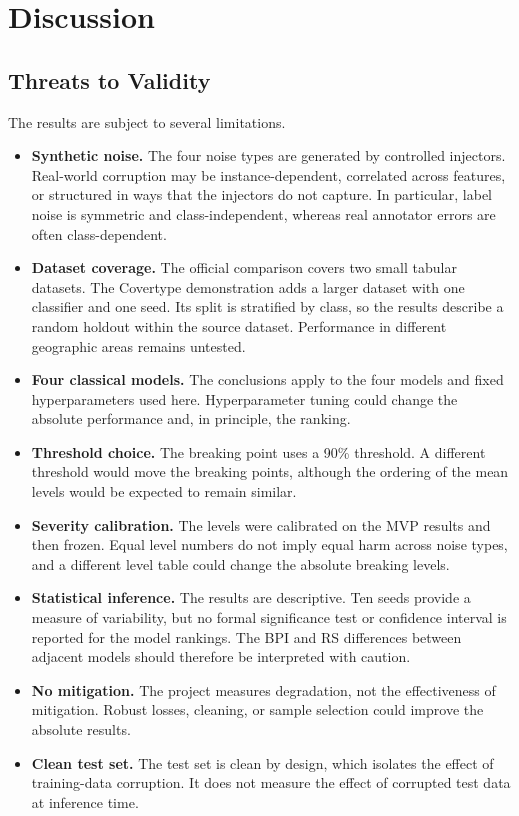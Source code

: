 \section{Discussion}

\subsection{Threats to Validity}

The results are subject to several limitations.

\begin{itemize}
  \item \textbf{Synthetic noise.} The four noise types are generated by controlled injectors. Real-world corruption may be instance-dependent, correlated across features, or structured in ways that the injectors do not capture. In particular, label noise is symmetric and class-independent, whereas real annotator errors are often class-dependent.
  \item \textbf{Dataset coverage.} The official comparison covers two small tabular datasets. The Covertype demonstration adds a larger dataset with one classifier and one seed. Its split is stratified by class, so the results describe a random holdout within the source dataset. Performance in different geographic areas remains untested.
  \item \textbf{Four classical models.} The conclusions apply to the four models and fixed hyperparameters used here. Hyperparameter tuning could change the absolute performance and, in principle, the ranking.
  \item \textbf{Threshold choice.} The breaking point uses a 90\% threshold. A different threshold would move the breaking points, although the ordering of the mean levels would be expected to remain similar.
  \item \textbf{Severity calibration.} The levels were calibrated on the MVP results and then frozen. Equal level numbers do not imply equal harm across noise types, and a different level table could change the absolute breaking levels.
  \item \textbf{Statistical inference.} The results are descriptive. Ten seeds provide a measure of variability, but no formal significance test or confidence interval is reported for the model rankings. The BPI and RS differences between adjacent models should therefore be interpreted with caution.
  \item \textbf{No mitigation.} The project measures degradation, not the effectiveness of mitigation. Robust losses, cleaning, or sample selection could improve the absolute results.
  \item \textbf{Clean test set.} The test set is clean by design, which isolates the effect of training-data corruption. It does not measure the effect of corrupted test data at inference time.
\end{itemize}

